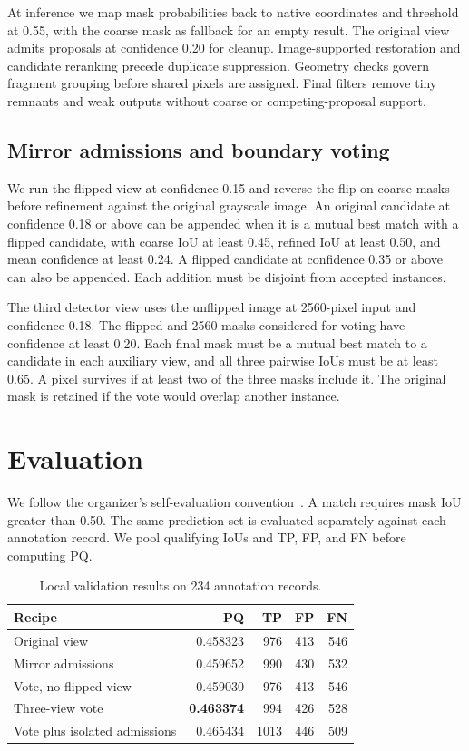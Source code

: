 \documentclass[sigconf]{acmart}
\begin{document}
At inference we map mask probabilities back to native coordinates and threshold at 0.55, with the coarse mask as fallback for an empty result. The original view admits proposals at confidence 0.20 for cleanup. Image-supported restoration and candidate reranking precede duplicate suppression. Geometry checks govern fragment grouping before shared pixels are assigned. Final filters remove tiny remnants and weak outputs without coarse or competing-proposal support.

\subsection{Mirror admissions and boundary voting}
We run the flipped view at confidence 0.15 and reverse the flip on coarse masks before refinement against the original grayscale image. An original candidate at confidence 0.18 or above can be appended when it is a mutual best match with a flipped candidate, with coarse IoU at least 0.45, refined IoU at least 0.50, and mean confidence at least 0.24. A flipped candidate at confidence 0.35 or above can also be appended. Each addition must be disjoint from accepted instances.

The third detector view uses the unflipped image at 2560-pixel input and confidence 0.18. The flipped and 2560 masks considered for voting have confidence at least 0.20. Each final mask must be a mutual best match to a candidate in each auxiliary view, and all three pairwise IoUs must be at least 0.65. A pixel survives if at least two of the three masks include it. The original mask is retained if the vote would overlap another instance.

\section{Evaluation}
We follow the organizer's self-evaluation convention~\cite{selfeval}. A match requires mask IoU greater than 0.50. The same prediction set is evaluated separately against each annotation record. We pool qualifying IoUs and TP, FP, and FN before computing PQ.

\begin{table}[h]
\centering
\caption{Local validation results on 234 annotation records.}
\begin{tabular}{lrrrr}
\toprule
Recipe & PQ & TP & FP & FN\\
\midrule
Original view & 0.458323 & 976 & 413 & 546\\
Mirror admissions & 0.459652 & 990 & 430 & 532\\
Vote, no flipped view & 0.459030 & 976 & 413 & 546\\
Three-view vote & \textbf{0.463374} & 994 & 426 & 528\\
Vote plus isolated admissions & 0.465434 & 1013 & 446 & 509\\
\bottomrule
\end{tabular}
\end{table}
\end{document}
